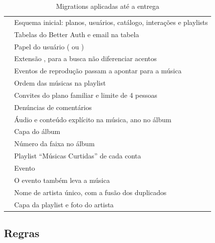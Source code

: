 \begin{table}[htbp]
  \centering
  \caption{Migrations aplicadas até a entrega}
  \label{tab:migrations}
  \small
  \begin{tabularx}{\textwidth}{@{}L{0.42}L{1.58}@{}}
    \toprule
     &  \\
    \midrule
     & Esquema inicial: planos, usuários, catálogo, interações e playlists \\
     & Tabelas do Better Auth e email na tabela  \\
     & Papel do usuário ( ou ) \\
     & Extensão , para a busca não diferenciar acentos \\
     & Eventos de reprodução passam a apontar para a música \\
     & Ordem das músicas na playlist \\
     & Convites do plano familiar e limite de 4 pessoas \\
     & Denúncias de comentários \\
     & Áudio e conteúdo explícito na música, ano no álbum \\
     & Capa do álbum \\
     & Número da faixa no álbum \\
     & Playlist ``Músicas Curtidas'' de cada conta \\
     & Evento  \\
     & O evento  também leva a música \\
     & Nome de artista único, com a fusão dos duplicados \\
     & Capa da playlist e foto do artista \\
    \bottomrule
  \end{tabularx}
\end{table}

\FloatBarrier
\subsection{Regras}

